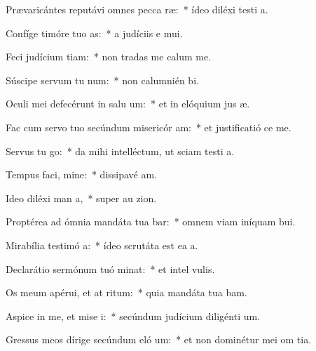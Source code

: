 \item Prævaricántes reputávi omnes pecca ræ:~* ídeo diléxi testi a.
\item Confíge timóre tuo  as:~* a judíciis e  mui.
\item Feci judícium  tiam:~* non tradas me calum me.
\item Súscipe servum tu  num:~* non calumnién  bi.
\item Oculi mei defecérunt in salu um:~* et in elóquium jus æ.
\item Fac cum servo tuo secúndum misericór am:~* et justificatió  ce me.
\item Servus tu  go:~* da mihi intelléctum, ut sciam testi a.
\item Tempus faci, mine:~* dissipavé  am.
\item Ideo diléxi man a,~* super au  zion.
\item Proptérea ad ómnia mandáta tua bar:~* omnem viam iníquam  bui.
\item Mirabília testimó a:~* ídeo scrutáta est ea  a.
\item Declarátio sermónum tuó minat:~* et intel  vulis.
\item Os meum apérui, et at ritum:~* quia mandáta tua bam.
\item Aspice in me, et mise i:~* secúndum judícium diligénti  um.
\item Gressus meos dírige secúndum eló um:~* et non dominétur mei om tia.
